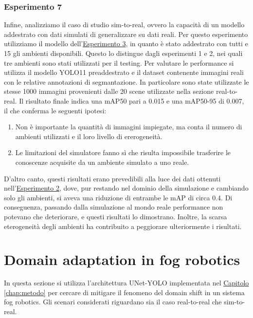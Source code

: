 \documentclass[12pt]{report}
\begin{document}
\subsubsection{Esperimento 7}
\label{sec:esperimento_7}

Infine, analizziamo il caso di studio sim-to-real, ovvero la capacità di un modello addestrato con dati simulati di generalizzare su dati reali. Per questo esperimento utilizziamo il modello dell'\hyperref[sec:esperimento_3]{Esperimento 3}, in quanto è stato addestrato con tutti e 15 gli ambienti disponibili. Questo lo distingue dagli esperimenti 1 e 2, nei quali tre ambienti sono stati utilizzati per il testing. Per valutare le performance si utilizza il modello YOLO11 preaddestrato e il dataset contenente immagini reali con le relative annotazioni di segmantazione. In particolare sono state utilizzate le stesse 1000 immagini provenienti dalle 20 scene utilizzate nella sezione real-to-real. Il risultato finale indica una  mAP50 pari a 0.015 e una mAP50-95 di 0.007, il che conferma le seguenti ipotesi:

\begin{enumerate}
	\item Non è importante la quantità di immagini impiegate, ma conta il numero di ambienti utilizzati e il loro livello di ererogeneità.
	
	\item Le limitazioni del simulatore fanno sì che risulta impossibile trasferire le conoscenze acquisite da un ambiente simulato a uno reale. 
\end{enumerate}

D'altro canto, questi risultati erano prevedibili alla luce dei dati ottenuti nell'\hyperref[sec:esperimento_2]{Esperimento 2}, dove, pur restando nel dominio della simulazione e cambiando solo gli ambienti, si aveva una riduzione di entrambe le mAP di circa 0.4. Di conseguenza, passando dalla simulazione al mondo reale performance non potevano che deteriorare, e questi risultati lo dimostrano. Inoltre, la scarsa eterogeneità degli ambienti ha contribuito a peggiorare ulteriormente i risultati.

\section{Domain adaptation in fog robotics}
\label{sec:domain_shift_in_contesto_fog_robotics}

In questa sezione si utilizza l'architettura UNet-YOLO implementata nel \hyperref[chap:metodo]{Capitolo \ref{chap:metodo}} per cercare di mitigare il fenomeno del domain shift in un sistema fog robotics. Gli scenari considerati riguardano sia il caso real-to-real che sim-to-real.
\end{document}
